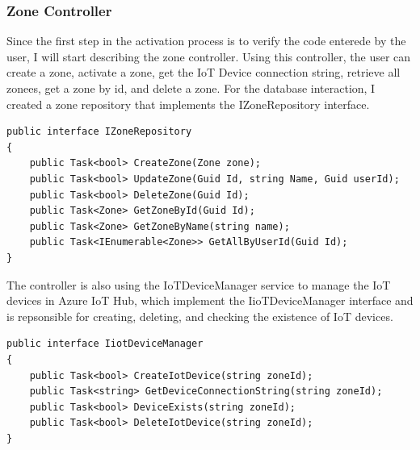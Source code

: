 \subsubsection{Zone Controller}
Since the first step in the activation process is to verify the code enterede by the
user, I will start describing the zone controller.
Using this controller, the user can create a zone, activate a zone, get the IoT Device connection string, retrieve
all zonees, get a zone by id, and delete a zone. For the database interaction, I created
a zone repository that implements the IZoneRepository interface.
\begin{lstlisting}[caption={Zone Repository interface}]
public interface IZoneRepository
{
    public Task<bool> CreateZone(Zone zone);
    public Task<bool> UpdateZone(Guid Id, string Name, Guid userId);
    public Task<bool> DeleteZone(Guid Id);
    public Task<Zone> GetZoneById(Guid Id);
    public Task<Zone> GetZoneByName(string name);
    public Task<IEnumerable<Zone>> GetAllByUserId(Guid Id);
}
\end{lstlisting}

The controller is also using the IoTDeviceManager service to manage the
IoT devices in Azure IoT Hub, which implement the IioTDeviceManager interface and 
is repsonsible for creating, deleting, and checking the existence of IoT devices.

\begin{lstlisting}[caption={IoT Device manager interface}]
public interface IiotDeviceManager
{
    public Task<bool> CreateIotDevice(string zoneId);
    public Task<string> GetDeviceConnectionString(string zoneId);
    public Task<bool> DeviceExists(string zoneId);
    public Task<bool> DeleteIotDevice(string zoneId);
}
\end{lstlisting}

